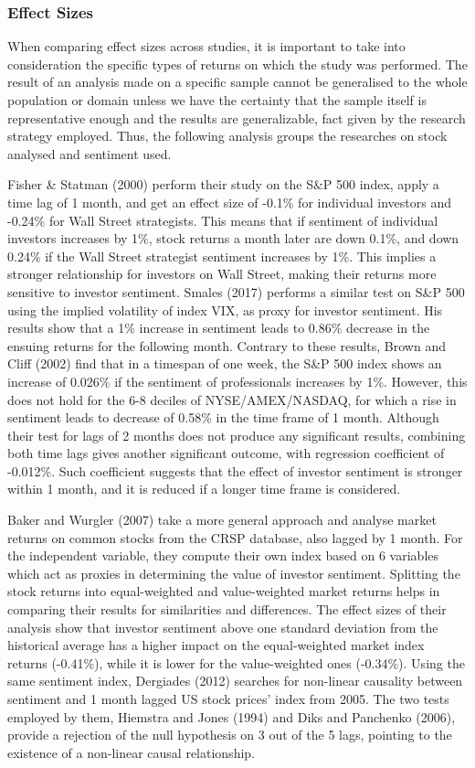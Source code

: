 \subsubsection{Effect Sizes}
When comparing effect sizes across studies, it is important to take into consideration the specific types of returns on which the study was performed. The result of an analysis made on a specific sample cannot be generalised to the whole population or domain unless we have the certainty that the sample itself is representative enough and the results are generalizable, fact given by the research strategy employed. Thus, the following analysis groups the researches on stock analysed and sentiment used.
\par
Fisher \& Statman (2000) perform their study on the S\&P 500 index, apply a time lag of 1 month, and get an effect size of -0.1\% for individual investors and -0.24\% for Wall Street strategists. This means that if sentiment of individual investors increases by 1\%, stock returns a month later are down 0.1\%, and down 0.24\% if the Wall Street strategist sentiment increases by 1\%. This implies a stronger relationship for investors on Wall Street, making their returns more sensitive to investor sentiment. Smales (2017) performs a similar test on S\&P 500 using the implied volatility of index VIX, as proxy for investor sentiment. His results show that a 1\% increase in sentiment leads to 0.86\% decrease in the ensuing returns for the following month. Contrary to these results, Brown and Cliff (2002) find that in a timespan of one week, the S\&P 500 index shows an increase of 0.026\% if the sentiment of professionals increases by 1\%. However, this does not hold for the 6-8 deciles of NYSE/AMEX/NASDAQ, for which a rise in sentiment leads to decrease of 0.58\% in the time frame of 1 month. Although their test for lags of 2 months does not produce any significant results, combining both time lags gives another significant outcome, with regression coefficient of -0.012\%. Such coefficient suggests that the effect of investor sentiment is stronger within 1 month, and it is reduced if a longer time frame is considered.
\par
Baker and Wurgler (2007) take a more general approach and analyse market returns on common stocks from the CRSP database, also lagged by 1 month. For the independent variable, they compute their own index based on 6 variables which act as proxies in determining the value of investor sentiment. Splitting the stock returns into equal-weighted and value-weighted market returns helps in comparing their results for similarities and differences. The effect sizes of their analysis show that investor sentiment above one standard deviation from the historical average has a higher impact on the equal-weighted market index returns (-0.41\%), while it is lower for the value-weighted ones (-0.34\%). Using the same sentiment index, Dergiades (2012) searches for non-linear causality between sentiment and 1 month lagged US stock prices’ index from 2005. The two tests employed by them, Hiemstra and Jones (1994) and Diks and Panchenko (2006), provide a rejection of the null hypothesis on 3 out of the 5 lags, pointing to the existence of a non-linear causal relationship.

